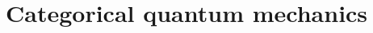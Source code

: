 \documentclass[12pt]{ociamthesis}  %
\begin{document}
\begin{definition}
\end{definition}


\begin{lemma}
\end{lemma}


\begin{lemma}
\end{lemma}

\section{Categorical quantum mechanics}

\begin{definition}
\end{definition}

\begin{definition}
\end{definition}


\begin{definition}
\end{definition}

\begin{definition}
\end{definition}



\end{document}
